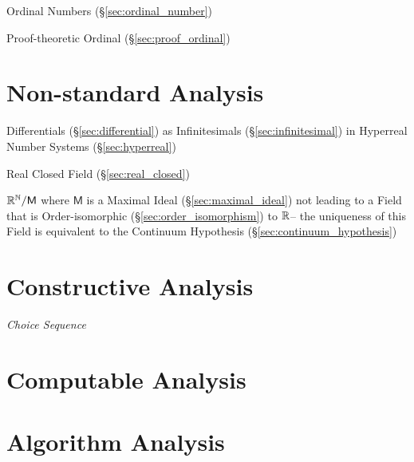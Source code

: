 {Ordinal Numbers (\S\ref{sec:ordinal_number})

Proof-theoretic Ordinal (\S\ref{sec:proof_ordinal})



\section{Non-standard Analysis}\label{sec:nonstandard_analysis}

Differentials (\S\ref{sec:differential}) as Infinitesimals
(\S\ref{sec:infinitesimal}) in Hyperreal Number Systems (\S\ref{sec:hyperreal})

Real Closed Field (\S\ref{sec:real_closed})

$\mathbb{R}^{\mathbb{N}} / \mathsf{M}$ where $\mathsf{M}$ is a Maximal Ideal
(\S\ref{sec:maximal_ideal}) not leading to a Field that is
Order-isomorphic (\S\ref{sec:order_isomorphism}) to $\mathbb{R}$-- the
uniqueness of this Field is equivalent to the Continuum Hypothesis
(\S\ref{sec:continuum_hypothesis})



\section{Constructive Analysis}\label{sec:constructive_analysis}

\emph{Choice Sequence}



\section{Computable Analysis}\label{sec:computable_analysis}

\section{Algorithm Analysis}\label{sec:algorithm_analysis}

}
